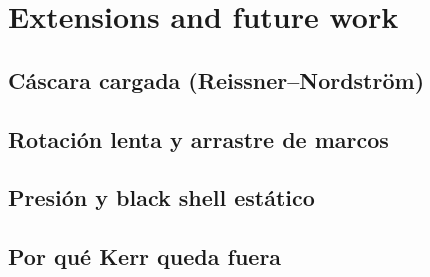 \chapter{Extensions and future work}
\label{cap:extensiones}

\section{Cáscara cargada (Reissner--Nordström)}

\section{Rotación lenta y arrastre de marcos}
\label{sec:rotacion}

\section{Presión y black shell estático}

\section{Por qué Kerr queda fuera}

